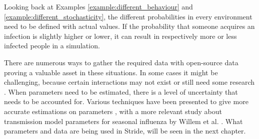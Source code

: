 \begin{example}
Looking back at Examples \ref{example:different_behaviour} and \ref{example:different_stochasticity}, the different probabilities in every environment need to be defined with actual values. If the probability that someone acquires an infection is slightly higher or lower, it can result in respectively more or less infected people in a simulation.
\end{example}

There are numerous ways to gather the required data with open-source data proving a valuable asset in these situations. In some cases it might be challenging, because certain interactions may not exist or still need some research \cite{abm_methods_and_techniques}. When parameters need to be estimated, there is a level of uncertainty that needs to be accounted for. Various techniques have been presented to give more accurate estimations on parameters \cite{lander_understand_models, parameter_importance_bilcke}, with a more relevant study about transmission model parameters for seasonal influenza by Willem et al. \cite{lander_estimating}. What parameters and data are being used in Stride, will be seen in the next chapter.
